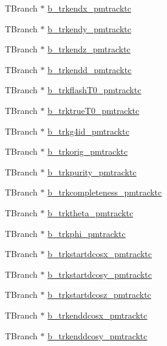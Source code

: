 \begin{DoxyCompactItemize}
T\-Branch $\ast$ \hyperlink{classanatree_a68b555e286931d3e1c36d963cf527636}{b\-\_\-trkendx\-\_\-pmtracktc}
\item 
T\-Branch $\ast$ \hyperlink{classanatree_a7c2a77fff06b4b8450e3454ac3760d3b}{b\-\_\-trkendy\-\_\-pmtracktc}
\item 
T\-Branch $\ast$ \hyperlink{classanatree_aafaf3bae1ef089935fde2fb02874b623}{b\-\_\-trkendz\-\_\-pmtracktc}
\item 
T\-Branch $\ast$ \hyperlink{classanatree_a4f78769cad9bdd6f7403bd13d704070c}{b\-\_\-trkendd\-\_\-pmtracktc}
\item 
T\-Branch $\ast$ \hyperlink{classanatree_af56746811c5e9d8bcee14ec22bef1c2e}{b\-\_\-trkflash\-T0\-\_\-pmtracktc}
\item 
T\-Branch $\ast$ \hyperlink{classanatree_a929f7c10a224776fcb1fb4ca2be1cfb9}{b\-\_\-trktrue\-T0\-\_\-pmtracktc}
\item 
T\-Branch $\ast$ \hyperlink{classanatree_accaf9659f3b7a1d7dcda0c45f610d5ed}{b\-\_\-trkg4id\-\_\-pmtracktc}
\item 
T\-Branch $\ast$ \hyperlink{classanatree_a10e462f3de5a5e5c0396e26ac36ea30a}{b\-\_\-trkorig\-\_\-pmtracktc}
\item 
T\-Branch $\ast$ \hyperlink{classanatree_a581a622e79179a9c52acf71e3e768480}{b\-\_\-trkpurity\-\_\-pmtracktc}
\item 
T\-Branch $\ast$ \hyperlink{classanatree_ab5c7a1ec336d298c1ea4f587e52b7fd7}{b\-\_\-trkcompleteness\-\_\-pmtracktc}
\item 
T\-Branch $\ast$ \hyperlink{classanatree_a1a523ae53ce709311467e97f1ff1569b}{b\-\_\-trktheta\-\_\-pmtracktc}
\item 
T\-Branch $\ast$ \hyperlink{classanatree_a45485e41f14006da8ce4be3ac67f7ca4}{b\-\_\-trkphi\-\_\-pmtracktc}
\item 
T\-Branch $\ast$ \hyperlink{classanatree_a6ba235f9beb026e48c7f70c61cab06de}{b\-\_\-trkstartdcosx\-\_\-pmtracktc}
\item 
T\-Branch $\ast$ \hyperlink{classanatree_af971449f44d1c957d3ca5326802a2f2e}{b\-\_\-trkstartdcosy\-\_\-pmtracktc}
\item 
T\-Branch $\ast$ \hyperlink{classanatree_a80c4ec66cae13c13119a3cad1f936895}{b\-\_\-trkstartdcosz\-\_\-pmtracktc}
\item 
T\-Branch $\ast$ \hyperlink{classanatree_ac712ef1b5e714989f0540877c0d84f97}{b\-\_\-trkenddcosx\-\_\-pmtracktc}
\item 
T\-Branch $\ast$ \hyperlink{classanatree_aa5a54f5da766c9944643c30760f64587}{b\-\_\-trkenddcosy\-\_\-pmtracktc}

\end{DoxyCompactItemize}
